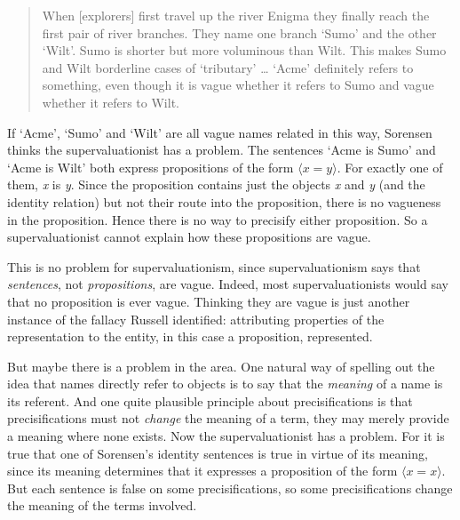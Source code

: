 \begin{quote}
When [explorers] first travel up the river Enigma they finally reach the first pair of river branches. They name one branch `Sumo' and the other `Wilt'. Sumo is shorter but more voluminous than Wilt. This makes Sumo and Wilt borderline cases of `tributary' {\dots} `Acme' definitely refers to something, even though it is vague whether it refers to Sumo and vague whether it refers to Wilt. \cite[180]{Sorensen2000}
\end{quote}

\noindent If `Acme', `Sumo' and `Wilt' are all vague names related in this way, Sorensen thinks the supervaluationist has a problem. The sentences `Acme is Sumo' and `Acme is Wilt' both express propositions of the form \(\langle x = y \rangle\). For exactly one of them, \textit{x} is \textit{y}. Since the proposition contains just the objects \textit{x} and \textit{y} (and the identity relation) but not their route into the proposition, there is no vagueness in the proposition. Hence there is no way to precisify either proposition. So a supervaluationist cannot explain how these propositions are vague.

This is no problem for supervaluationism, since supervaluationism says that \textit{sentences}, not \textit{propositions}, are vague. Indeed, most supervaluationists would say that no proposition is ever vague. Thinking they are vague is just another instance of the fallacy Russell identified: attributing properties of the representation to the entity, in this case a proposition, represented.

But maybe there is a problem in the area. One natural way of spelling out the idea that names directly refer to objects is to say that the \textit{meaning} of a name is its referent. And one quite plausible principle about precisifications is that precisifications must not \textit{change} the meaning of a term, they may merely provide a meaning where none exists. Now the supervaluationist has a problem. For it is true that one of Sorensen's identity sentences is true in virtue of its meaning, since its meaning determines that it expresses a proposition of the form \(\langle x = x \rangle\). But each sentence is false on some precisifications, so some precisifications change the meaning of the terms involved.

